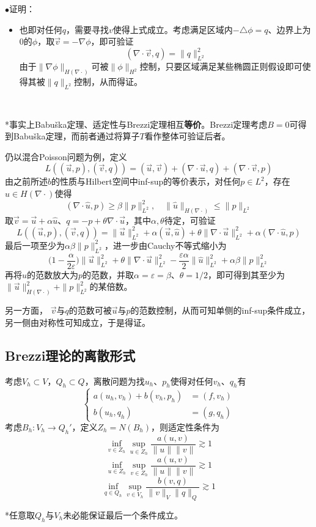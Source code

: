 \documentclass[a4paper,UTF8,fontset=windows]{ctexart}
\newcommand{\proo}[1]{{\kaishu $\bullet$证明：
\begin{itemize}
    \item[] #1
\end{itemize}
}}
\begin{document}
\proo{
    也即对任何$q$，需要寻找$v$使得上式成立。考虑满足区域内$-\triangle\phi=q$、边界上为0的$\phi$，取$\vec{v}=-\nabla\phi$，即可验证
    $$(\nabla\cdot\vec{v},q)=\|q\|_{L^2}^2$$
    由于$\|\nabla\phi\|_{H(\nabla\cdot)}$可被$\|\phi\|_{H^2}$控制，只要区域满足某些椭圆正则假设即可使得其被$\|q\|_{L^2}$控制，从而得证。
}

\

*事实上Babu\v ska定理、适定性与Brezzi定理相互\textbf{等价}。Brezzi定理考虑$B=0$可得到Babu\v ska定理，而前者通过将算子$T$看作整体可验证后者。

仍以混合Poisson问题为例，定义
$$L((\vec{u},p),(\vec{v},q))=(\vec{u},\vec{v})+(\nabla\cdot\vec{u},q)+(\nabla\cdot\vec{v},p)$$
由之前所述$b$的性质与Hilbert空间中inf-sup的等价表示，对任何$p\in L^2$，存在$\hat{u}\in H(\nabla\cdot)$使得
$$(\nabla\cdot\hat{u},p)\ge\beta\|p\|_{L^2}^2,\quad\|\hat{u}\|_{H(\nabla\cdot)}\le\|p\|_{L^2}$$
取$\vec{v}=\vec{u}+\alpha\hat{u}$、$q=-p+\theta\nabla\cdot\vec{u}$，其中$\alpha,\theta$待定，可验证
$$L((\vec{u},p),(\vec{v},q))=\|\vec{u}\|_{L^2}^2+\alpha(\vec{u},\hat{u})+\theta\|\nabla\cdot\vec{u}\|_{L^2}^2+\alpha(\nabla\cdot\hat{u},p)$$
最后一项至少为$\alpha\beta\|p\|_{L^2}^2$，进一步由Cauchy不等式缩小为
$$\bigg(1-\frac{\alpha}{2\varepsilon}\bigg)\|\vec{u}\|_{L^2}^2+\theta\|\nabla\cdot\vec{u}\|_{L^2}^2-\frac{\varepsilon\alpha}{2}\|\hat{u}\|_{L^2}^2+\alpha\beta\|p\|_{L^2}^2$$
再将$\hat{u}$的范数放大为$p$的范数，并取$\alpha=\varepsilon=\beta$、$\theta=1/2$，即可得到其至少为$\|\vec{u}\|_{H(\nabla\cdot)}^2+\|p\|_{L^2}^2$的某倍数。

另一方面， $\vec{v}$与$q$的范数可被$\vec{u}$与$p$的范数控制，从而可知单侧的inf-sup条件成立，另一侧由对称性可知成立，于是得证。

\subsection{Brezzi理论的离散形式}

考虑$V_h\subset V$，$Q_h\subset Q$，离散问题为找$u_h$、$p_h$使得对任何$v_h$、$q_h$有
$$\begin{cases}a(u_h,v_h)+b(v_h,p_h)&=(f,v_h)\\b(u_h,q_h)&=(g,q_h)\end{cases}$$
考虑$B_h:V_h\to Q_h'$，定义$Z_h=N(B_h)$，则适定性条件为
$$\inf_{v\in Z_h}\sup_{u\in Z_h}\frac{a(u,v)}{\|u\|\|v\|}\gtrsim1$$
$$\inf_{u\in Z_h}\sup_{v\in Z_h}\frac{a(u,v)}{\|u\|\|v\|}\gtrsim1$$
$$\inf_{q\in Q_h}\sup_{v\in V_h}\frac{b(v,q)}{\|v\|_V\|q\|_Q}\gtrsim1$$

*任意取$Q_h$与$V_h$未必能保证最后一个条件成立。
\end{document}
